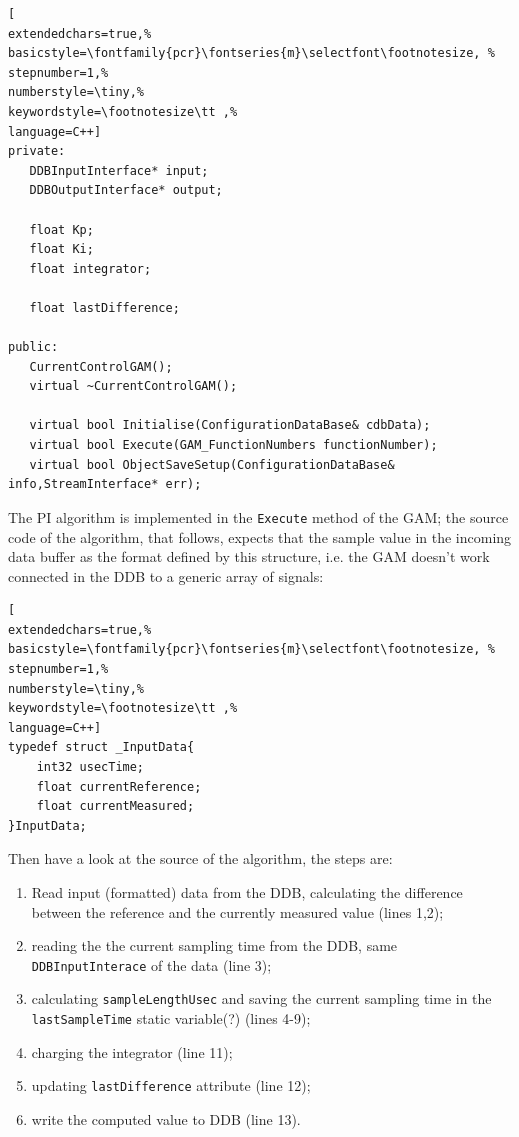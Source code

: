 \begin{lstlisting}[
extendedchars=true,%
basicstyle=\fontfamily{pcr}\fontseries{m}\selectfont\footnotesize, %
stepnumber=1,%
numberstyle=\tiny,%
keywordstyle=\footnotesize\tt ,%
language=C++]
private:
   DDBInputInterface* input;
   DDBOutputInterface* output;

   float Kp;
   float Ki;
   float integrator;

   float lastDifference;

public:
   CurrentControlGAM();
   virtual ~CurrentControlGAM();

   virtual bool Initialise(ConfigurationDataBase& cdbData);
   virtual bool Execute(GAM_FunctionNumbers functionNumber);
   virtual bool ObjectSaveSetup(ConfigurationDataBase& info,StreamInterface* err);
\end{lstlisting}

The PI algorithm is implemented in the \texttt{Execute} method of the GAM; the source code of the algorithm, that follows, expects that the sample value in the incoming data buffer as the format defined by this structure, i.e. the GAM doesn't work connected in the DDB to a generic array of signals:

\begin{lstlisting}[
extendedchars=true,%
basicstyle=\fontfamily{pcr}\fontseries{m}\selectfont\footnotesize, %
stepnumber=1,%
numberstyle=\tiny,%
keywordstyle=\footnotesize\tt ,%
language=C++]
typedef struct _InputData{
    int32 usecTime;
    float currentReference;
    float currentMeasured;
}InputData;
\end{lstlisting}

Then have a look at the source of the algorithm, the steps are:
\begin{enumerate}
 \item Read input (formatted) data from the DDB, calculating the difference between the reference and the currently measured value (lines 1,2);
 \item  reading the the current sampling time from the DDB, same \texttt{DDBInputInterace} of the data (line 3);
 \item  calculating \texttt{sampleLengthUsec} and saving the current sampling time in the \texttt{lastSampleTime} static variable(?) (lines 4-9);
 \item  charging the integrator (line 11);
 \item  updating \texttt{lastDifference} attribute (line 12);
 \item  write the computed value to DDB (line 13).
\end{enumerate}

